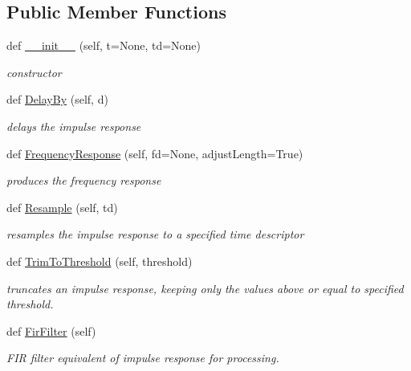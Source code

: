 \subsection*{Public Member Functions}
\begin{DoxyCompactItemize}
\item 
def \hyperlink{classSignalIntegrity_1_1TimeDomain_1_1Waveform_1_1ImpulseResponse_1_1ImpulseResponse_ade7e2b05916c8bb56f58333b3fca239d}{\+\_\+\+\_\+init\+\_\+\+\_\+} (self, t=None, td=None)
\begin{DoxyCompactList}\small\item\em constructor \end{DoxyCompactList}\item 
def \hyperlink{classSignalIntegrity_1_1TimeDomain_1_1Waveform_1_1ImpulseResponse_1_1ImpulseResponse_adc875e86caadbd6201fd6a3528526cad}{Delay\+By} (self, d)
\begin{DoxyCompactList}\small\item\em delays the impulse response \end{DoxyCompactList}\item 
def \hyperlink{classSignalIntegrity_1_1TimeDomain_1_1Waveform_1_1ImpulseResponse_1_1ImpulseResponse_a8a375a8188c5b58fa6f933db5737ddd1}{Frequency\+Response} (self, fd=None, adjust\+Length=True)
\begin{DoxyCompactList}\small\item\em produces the frequency response \end{DoxyCompactList}\item 
def \hyperlink{classSignalIntegrity_1_1TimeDomain_1_1Waveform_1_1ImpulseResponse_1_1ImpulseResponse_adc3851330110033606ca742a0025ae1a}{Resample} (self, td)
\begin{DoxyCompactList}\small\item\em resamples the impulse response to a specified time descriptor \end{DoxyCompactList}\item 
def \hyperlink{classSignalIntegrity_1_1TimeDomain_1_1Waveform_1_1ImpulseResponse_1_1ImpulseResponse_ac9668c22e21b9fcbfb1163ba5c2f9577}{Trim\+To\+Threshold} (self, threshold)
\begin{DoxyCompactList}\small\item\em truncates an impulse response, keeping only the values above or equal to specified threshold. \end{DoxyCompactList}\item 
def \hyperlink{classSignalIntegrity_1_1TimeDomain_1_1Waveform_1_1ImpulseResponse_1_1ImpulseResponse_a42a5eeb1a372a3e4c8beb7aed8cc2e13}{Fir\+Filter} (self)
\begin{DoxyCompactList}\small\item\em F\+IR filter equivalent of impulse response for processing. \end{DoxyCompactList}\end{DoxyCompactItemize}


